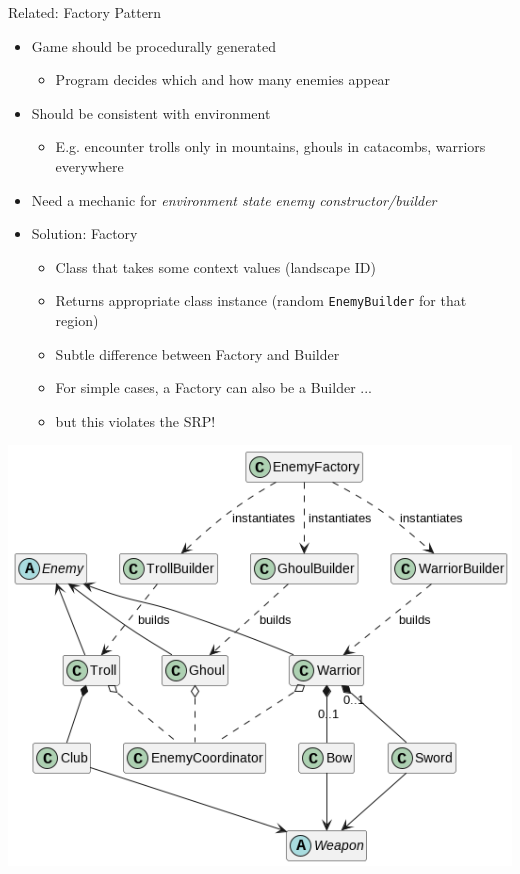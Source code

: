 
\begin{frame}{Related: Factory Pattern}
%
\begin{itemize}
\item Game should be procedurally generated
	\begin{itemize}
	\item[\Thus] Program decides which and how many enemies appear
	\end{itemize}
\item Should be consistent with environment
	\begin{itemize}
	\item E.\;g. encounter trolls only in mountains, ghouls in catacombs, warriors everywhere
	\end{itemize}
\item[\Thus] Need a mechanic for \emph{environment state} \thus \emph{enemy constructor/builder}
	\pause
\item Solution: Factory
	\begin{itemize}
	\item Class that takes some context values (\zB landscape ID) 
	\item Returns appropriate class instance (\zB random \texttt{EnemyBuilder} for that region)
	\item Subtle difference between Factory and Builder
\pause
	\item For simple cases, a Factory can also be a Builder ... 
	\item but this violates the SRP!
	\end{itemize}
\end{itemize}
%
\end{frame}


\begin{frame}
%
\begin{center}
\includegraphics[width=.65\linewidth]{./gfx/15-uml-big}
\end{center}
%
\end{frame}


